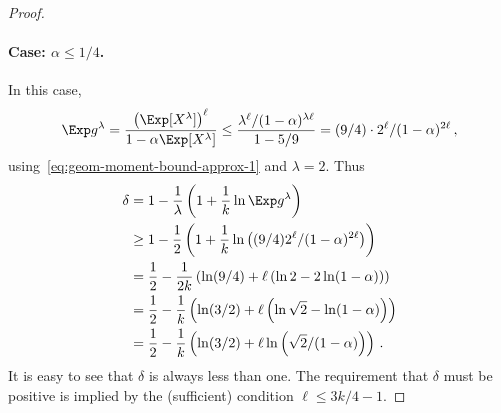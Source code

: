 \begin{proof}
\paragraph{Case: $\alpha \leq 1/4$.}
In this case, 
\[
    \Exp g^\lambda 
    = \frac{\left(\Exp[X^\lambda] \right)^\ell}{1 - \alpha \Exp[X^\lambda]} 
    \leq \frac{\lambda^\ell/(1 - \alpha)^{\lambda \ell}}{1 - 5/9}
    = (9/4) \cdot 2^\ell/(1-\alpha)^{2\ell}
    \,,
\]
using~\eqref{eq:geom-moment-bound-approx-1} and $\lambda = 2$. 
Thus
\begin{align*}
    \delta
    &= 1 - \frac{1}{\lambda}\left(1 + \frac{1}{k} \ln \Exp g^\lambda \right) \\
    &\geq 1 - \frac{1}{2}\left(1 + \frac{1}{k} \ln \left( (9/4)  2^\ell/(1-\alpha)^{2\ell} \right) \right) \\
    &= \frac{1}{2} - \frac{1}{2k} \left(\ln(9/4) + \ell \left( \ln 2 - 2 \ln(1-\alpha) \right) \right) \\
    &= \frac{1}{2} - \frac{1}{k} \left(\ln(3/2) + \ell \left( \ln \sqrt{2} - \ln(1-\alpha) \right) \right)\\
    &= \frac{1}{2} - \frac{1}{k} \left(\ln(3/2) + \ell \ln \left(  \sqrt{2}/(1-\alpha) \right) \right)
    \,.
\end{align*}
It is easy to see that $\delta$ is always less than one.
The requirement that $\delta$ must be positive is 
implied by the (sufficient) condition $\ell \leq 3k/4 -1$.


\end{proof}
